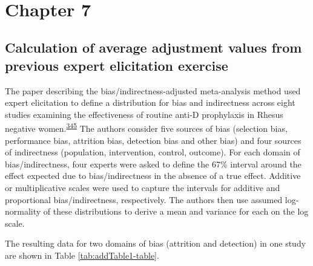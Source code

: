 \documentclass[a4paper, twoside]{templates/ociamthesis}
\begin{document}
~

\hypertarget{appendix-tri-analysis}{%
\section{Chapter 7}\label{appendix-tri-analysis}}

\hypertarget{appendix-adjustment-values}{%
\subsection{Calculation of average adjustment values from previous expert elicitation exercise}\label{appendix-adjustment-values}}

The paper describing the bias/indirectness-adjusted meta-analysis method used expert elicitation to define a distribution for bias and indirectness across eight studies examining the effectiveness of routine anti-D prophylaxis in Rhesus negative women.\textsuperscript{\protect\hyperlink{ref-turner2009}{345}} The authors consider five sources of bias (selection bias, performance bias, attrition bias, detection bias and other bias) and four sources of indirectness (population, intervention, control, outcome). For each domain of bias/indirectness, four experts were asked to define the 67\% interval around the effect expected due to bias/indirectness in the absence of a true effect. Additive or multiplicative scales were used to capture the intervals for additive and proportional bias/indirectness, respectively. The authors then use assumed log-normality of these distributions to derive a mean and variance for each on the log scale.

The resulting data for two domains of bias (attrition and detection) in one study are shown in Table \ref{tab:addTable1-table}.

~\\
\end{document}
